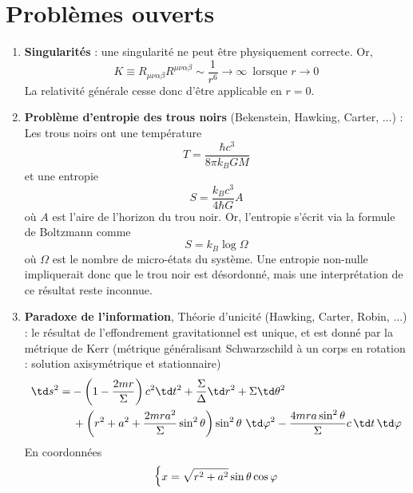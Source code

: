 \section{Problèmes ouverts}
\begin{enumerate}
    \item \textbf{Singularités} : une singularité ne peut être physiquement correcte. Or,
    \begin{equation}
        K \equiv R_{\mu\nu \alpha\beta} R^{\mu\nu\alpha\beta} \sim \frac{1}{r^6} \to \infty \, \text{ lorsque } r\to 0
    \end{equation}
    La relativité générale cesse donc d'être applicable en $r=0$.
    \item \textbf{Problème d'entropie des trous noirs} (Bekenstein, Hawking, Carter, ...) : Les trous noirs ont une température
    \begin{equation}
        T = \frac{\hbar c^3}{8\pi k_B GM}
    \end{equation}
    et une entropie
    \begin{equation}
        S = \frac{k_B c^3}{4 \hbar G}A
    \end{equation}
    où $A$ est l'aire de l'horizon du trou noir. Or, l'entropie s'écrit via la formule de Boltzmann comme
    \begin{equation}
        S = k_B \log \Omega
    \end{equation}
    où $\Omega$ est le nombre de micro-états du système. Une entropie non-nulle impliquerait donc que le trou noir est désordonné, mais une interprétation de ce résultat reste inconnue.
    \item \textbf{Paradoxe de l'information}, Théorie d'unicité (Hawking, Carter, Robin, ...) : le résultat de l'effondrement gravitationnel est unique, et est donné par la métrique de Kerr (métrique généralisant Schwarzschild à un corps en rotation : solution axisymétrique et stationnaire) 
    \begin{align*}
    \td s^{2} =& -\left( 1 - \frac{2m r}{\Sigma} \right) c^{2} \td t^{2} + \frac{\Sigma}{\Delta} \td r^{2} + \Sigma \td \theta^{2} \\
    & \,+ \left(r^2+ a^2 + \frac{2m r a^{2}}{\Sigma} \sin^{2}\theta \right) \sin^{2}\theta \ \td \varphi^{2} - \frac{4m ra \sin^{2} \theta}{\Sigma} c \, \td t \, \td \varphi
    \end{align*}
    En coordonnées
    \begin{equation}
        \begin{dcases}
            x = \sqrt{r^2 + a^2} \sin \theta \cos\varphi\\

\end{dcases}
\end{equation}
\end{enumerate}
